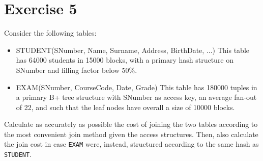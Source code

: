 \section{Exercise 5}

Consider the following tables: 
\begin{itemize}
    \item STUDENT(SNumber, Name, Surname, Address, BirthDate, $\dots$)
        This table has 64000 students in 15000 blocks, with a primary hash structure on SNumber and filling factor below 50\%. 
    \item EXAM(SNumber, CourseCode, Date, Grade)
        This table has 180000 tuples in a primary B+ tree structure with SNumber as access key, an average fan-out of 22, and such that the leaf nodes have overall a size of 10000 blocks. 
\end{itemize}
Calculate as accurately as possible the cost of joining the two tables according to the most convenient join method given the access structures.
Then, also calculate the join cost in case \texttt{EXAM} were, instead, structured according to the same hash as \texttt{STUDENT}.

